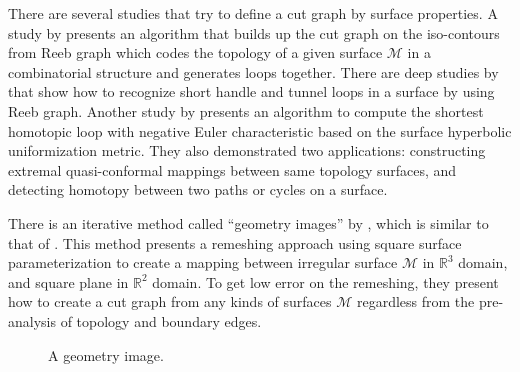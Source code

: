 \documentclass[a4paper,twoside]{article}
\begin{document}
There are several studies that try to define a cut graph by surface properties. A study by \cite{Patane:2007:FCB:1224804.1224947} presents an algorithm that builds up the cut graph on the iso-contours from Reeb graph which codes the topology of a given surface $\mathscr{M}$ in a combinatorial structure and generates loops together. There are deep studies by \cite{Dey:2008:CGH:1360612.1360644,Dey:2013:ECH:2461912.2462017} that show how to recognize short handle and tunnel loops in a surface by using Reeb graph.  Another study by \cite{Jin:2013:CSH:2396897.2396971} presents an algorithm to compute the shortest homotopic loop with negative Euler characteristic based on the surface hyperbolic uniformization metric. They also demonstrated two applications: constructing extremal quasi-conformal mappings between same topology surfaces, and detecting homotopy between two paths or cycles on a surface. 

There is an iterative method called ``geometry images'' by \cite{Gu:2002:GI:566654.566589}, which is similar to that of \cite{Dey:1994:NTC:177424.178001}. This method presents a remeshing approach using square surface parameterization to create a mapping between irregular surface $\mathscr{M}$ in $\mathbb{R}^3$ domain, and square plane in $\mathbb{R}^2$ domain. To get low error on the remeshing, they present how to create a cut graph from any kinds of surfaces $\mathscr{M}$ regardless from the pre-analysis of topology and boundary edges.

\begin{figure}[!h]
	\centering
	\hspace{10pt}
	
	\caption{A geometry image.}
	\label{fig:gim figure}
\end{figure}
\end{document}
